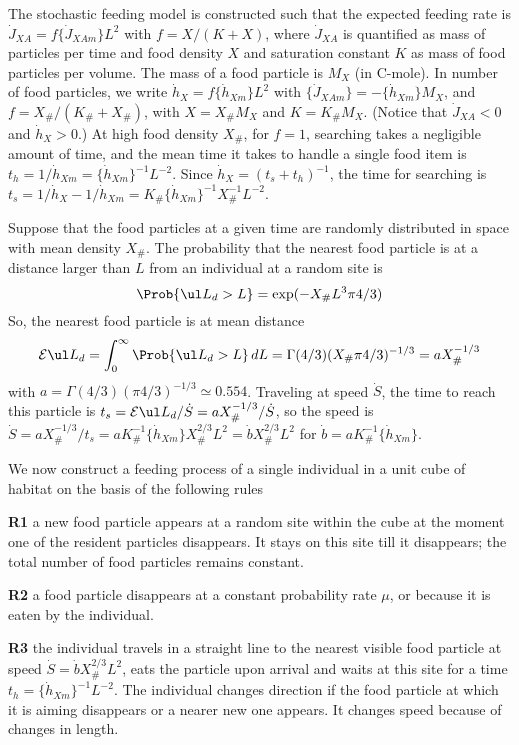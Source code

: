 The stochastic feeding model is constructed such that the expected feeding rate is $\dot{J}_{XA} = f \{\dot{J}_{XAm}\} L^2$ with $f = X/ (K + X)$, where $\dot{J}_{XA}$ is quantified as mass of particles per time and food density $X$ and saturation constant $K$ as mass of food particles per volume. 
The mass of a food particle is $M_X$ (in C-mole). 
In number of food particles, we write 
$\dot{h}_X = f \{\dot{h}_{Xm}\} L^2$ 
with 
$\{\dot{J}_{XAm}\} = - \{\dot{h}_{Xm}\} M_X$, 
and 
$f = X_\#/ (K_\# + X_\#)$, with $X = X_\# M_X$ and $K = K_\# M_X$. 
(Notice that $\dot{J}_{XA} < 0$ and $ \dot{h}_X > 0$.) 
At high food density $X_\#$, for $f = 1$, searching takes a negligible amount of time, and the mean time it takes to handle a single food item is 
$t_h = 1/ \dot{h}_{Xm} = \{\dot{h}_{Xm}\}^{-1} L^{-2}$.  
Since $\dot{h}_X = (t_s + t_h)^{-1}$, the time for searching is 
$t_s = 1/ \dot{h}_X - 1/ \dot{h}_{Xm} = K_\# \{\dot{h}_{Xm}\}^{-1} X_\#^{-1} L^{-2}$.
  
Suppose that the food particles at a given time are randomly distributed in space with mean density $X_\#$. The probability that the nearest food particle is at a distance larger than $L$ from an individual at a random site is
\[
    \Prob \{\ul L_d > L\} = \exp(- X_\# L^3 \pi 4/3)
\]
So, the nearest food particle is at mean distance
\[
    {\cal E} \ul L_d = \int_0^\infty \Prob \{\ul L_d > L\} \, dL
    = \Gamma(4/3) (X_\# \pi 4/3)^{-1/3} = a X_\#^{-1/3} 
\]
with $a = \Gamma(4/3) (\pi 4/3)^{-1/3} \simeq 0.554$. 
Traveling at speed $\dot{S}$, the time to reach this particle is $t_s = {\cal E} \ul L_d/ \dot{S} = a X_\#^{-1/3}/ \dot{S}$, so the speed is $\dot{S} = a X_\#^{-1/3}/ t_s = a K_\#^{-1} \{\dot{h}_{Xm}\} X_\#^{2/3} L^2 = \dot{b}
X_\#^{2/3} L^2$ for $\dot{b} = a K_\#^{-1} \{\dot{h}_{Xm}\}$.
  
We now construct a feeding process of a single individual in a unit cube of habitat on the basis of the following rules
  
{\bf R1} a new food particle appears at a random site within the cube at the moment one of the resident particles disappears.  
It stays on this site till it disappears; the total number of food particles remains constant.
  
{\bf R2} a food particle disappears at a constant probability rate $\mu$, or because it is eaten by the individual.
  
{\bf R3} the individual travels in a straight line to the nearest visible food particle at speed $\dot{S} = \dot{b} X_\#^{2/3} L^2$, eats the particle upon arrival and waits at this site for a time $t_h = \{\dot{h}_{Xm}\}^{-1} L^{-2}$.
The individual changes direction if the food particle at which it is aiming disappears or a nearer new one appears. 
It changes speed because of changes in length.
  
